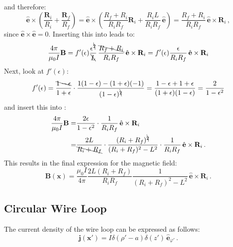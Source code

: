 and therefore:
\begin{equation}
   \hat{\mathbf{e}} \times \left( \frac{\mathbf{R}_i}{R_i} + \frac{\mathbf{R}_f}{R_f} \right)
 = \hat{\mathbf{e}} \times \left( \frac{R_f+R_i}{R_i R_f} \mathbf{R}_i + \frac{R_i L}{R_i R_f} \, \hat{\mathbf{e}} \right)
 = \frac{R_f+R_i}{R_i R_f} \, \hat{\mathbf{e}} \times \mathbf{R}_i \, ,
\end{equation}
since $\hat{\mathbf{e}} \times \hat{\mathbf{e}} = 0$.
Inserting this into  leads to:
\begin{equation}
   \frac{4 \pi}{\mu_0 I} \mathbf{B}
 = f'(\epsilon) \frac{\epsilon^{\bcancel{2}}}{\bcancel{L}} \, \frac{\bcancel{R_f+R_i}}{R_i R_f} \, \hat{\mathbf{e}} \times \mathbf{R}_i
 = f'(\epsilon) \frac{\epsilon}{R_i R_f} \, \hat{\mathbf{e}} \times \mathbf{R}_i \label{eqn:B_intermediate_2}
\end{equation}
Next, look at $f'(\epsilon)$:
\begin{equation}
   f'(\epsilon)
 = \frac{\bcancel{1 - \epsilon}}{1 + \epsilon} \cdot \frac{1 (1-\epsilon) - (1+\epsilon) (-1)}{(1 - \epsilon)^{\bcancel{2}}}
 = \frac{1 - \epsilon + 1 + \epsilon}{(1 + \epsilon)(1 - \epsilon)}
 = \frac{2}{1 - \epsilon^2}
\end{equation}
and insert this into :
\begin{align}
   \frac{4 \pi}{\mu_0 I} \mathbf{B}
 = & \frac{2 \epsilon}{1 - \epsilon^2} \cdot \frac{1}{R_i R_f} \, \hat{\mathbf{e}} \times \mathbf{R}_i \\
 = & \frac{2 L}{\bcancel{R_i + R_f}} \cdot \frac{(R_i + R_f)^{\bcancel{2}}}{(R_i + R_f)^2 - L^2} \cdot \frac{1}{R_i R_f} \, \hat{\mathbf{e}} \times \mathbf{R}_i \, .
\end{align}
This results in the final expression for the magnetic field:
\begin{equation}
 \boxed{\mathbf{B} (\mathbf{x}) = \frac{\mu_0 I}{4 \pi} \frac{2 L (R_i + R_f)}{R_i R_f} \frac{1}{(R_i + R_f)^2 - L^2} \, \hat{\mathbf{e}} \times \mathbf{R}_i } \, .
\end{equation}

\subsection{Circular Wire Loop}
The current density of the wire loop can be expressed as follows:
\begin{equation}
  \mathbf{j}(\mathbf{x}') = I \delta(\rho' - a) \delta(z') \,\hat{\mathbf{e}}_{\varphi'} \, .
\end{equation}

